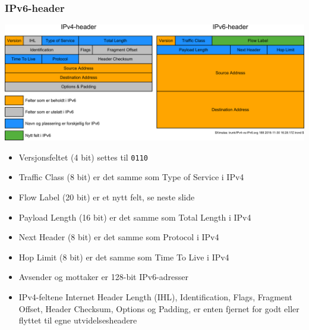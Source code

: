 \begin{frame}
  \frametitle{IPv6-header}
  \begin{multicols}{2}
      {\includegraphics[scale=.1225]{IPv4-vs-IPv6.pdf}}

    \begin{itemize}
    \item Versjonsfeltet (4 bit) settes til \texttt{0110}
    \item Traffic Class (8 bit) er det samme som Type of Service i
      IPv4
    \item Flow Label (20 bit) er et nytt felt, se neste slide
    \item Payload Length (16 bit) er det samme som Total Length i IPv4
    \item Next Header (8 bit) er det samme som Protocol i IPv4
    \item Hop Limit (8 bit) er det samme som Time To Live i IPv4
    \item Avsender og mottaker er 128-bit IPv6-adresser
    \item IPv4-feltene Internet Header Length (IHL), Identification,
      Flags, Fragment Offset, Header Checksum, Options og Padding, er
      enten fjernet for godt eller flyttet til egne utvidelsesheadere
    \end{itemize}
  \end{multicols}
\end{frame}

